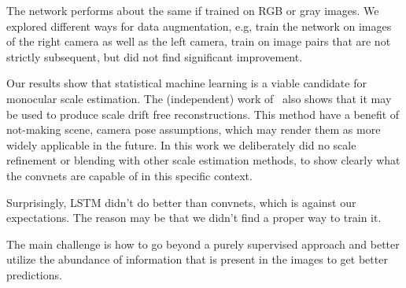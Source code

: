 The network performs about the same if trained on RGB or gray images.
We explored different ways for data augmentation, e.g, train the
network on images of the right camera as well as the left camera,
train on image pairs that are not strictly subsequent, but did not
find significant improvement.

Our results show that statistical machine learning is a viable
candidate for monocular scale estimation.  The (independent) work
of~\cite{frost2016} also shows that it may be used to produce scale
drift free reconstructions.  This method have a benefit of not-making
scene, camera pose assumptions, which may render them as more widely
applicable in the future.  In this work we deliberately did no scale
refinement or blending with other scale estimation methods, to show
clearly what the convnets are capable of in this specific context.

Surprisingly, LSTM didn't do better than convnets, which is against
our expectations. The reason may be that we didn't find a proper way
to train it.

The main challenge is how to go beyond a purely supervised approach
and better utilize the abundance of information that is present in the
images to get better predictions.

